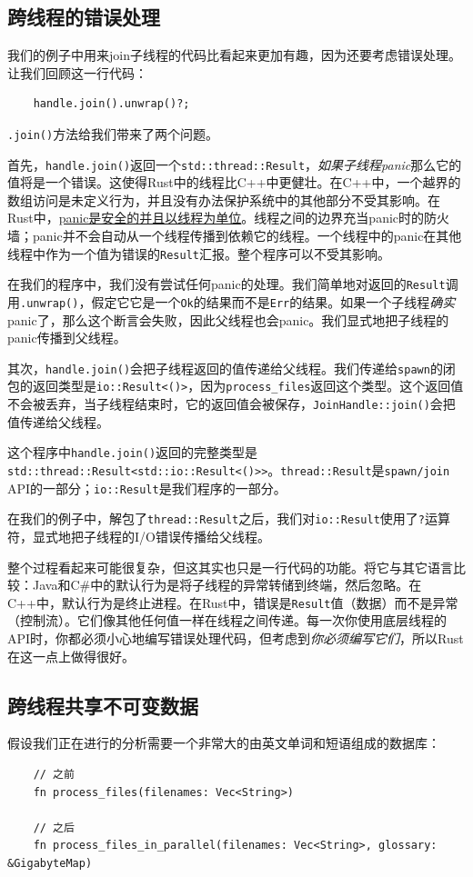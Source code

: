 \subsection{跨线程的错误处理}
我们的例子中用来join子线程的代码比看起来更加有趣，因为还要考虑错误处理。让我们回顾这一行代码：
\begin{verbatim}
    handle.join().unwrap()?;
\end{verbatim}

\texttt{.join()}方法给我们带来了两个问题。

首先，\texttt{handle.join()}返回一个\texttt{std::thread::Result}，\emph{如果子线程panic}那么它的值将是一个错误。这使得Rust中的线程比C++中更健壮。在C++中，一个越界的数组访问是未定义行为，并且没有办法保护系统中的其他部分不受其影响。在Rust中，\hyperref[unwind]{panic是安全的并且以线程为单位}。线程之间的边界充当panic时的防火墙；panic并不会自动从一个线程传播到依赖它的线程。一个线程中的panic在其他线程中作为一个值为错误的\texttt{Result}汇报。整个程序可以不受其影响。

在我们的程序中，我们没有尝试任何panic的处理。我们简单地对返回的\texttt{Result}调用\texttt{.unwrap()}，假定它它是一个\texttt{Ok}的结果而不是\texttt{Err}的结果。如果一个子线程\emph{确实}panic了，那么这个断言会失败，因此父线程也会panic。我们显式地把子线程的panic传播到父线程。

其次，\texttt{handle.join()}会把子线程返回的值传递给父线程。我们传递给\texttt{spawn}的闭包的返回类型是\texttt{io::Result<()>}，因为\texttt{process\_files}返回这个类型。这个返回值不会被丢弃，当子线程结束时，它的返回值会被保存，\texttt{JoinHandle::join()}会把值传递给父线程。

这个程序中\texttt{handle.join()}返回的完整类型是\texttt{std::thread::Result<std::io::Result<()>>}。\texttt{thread::Result}是\texttt{spawn/join} API的一部分；\texttt{io::Result}是我们程序的一部分。

在我们的例子中，解包了\texttt{thread::Result}之后，我们对\texttt{io::Result}使用了\texttt{?}运算符，显式地把子线程的I/O错误传播给父线程。

整个过程看起来可能很复杂，但这其实也只是一行代码的功能。将它与其它语言比较：Java和C\#中的默认行为是将子线程的异常转储到终端，然后忽略。在C++中，默认行为是终止进程。在Rust中，错误是\texttt{Result}值（数据）而不是异常（控制流）。它们像其他任何值一样在线程之间传递。每一次你使用底层线程的API时，你都必须小心地编写错误处理代码，但考虑到\emph{你必须编写它们}，所以Rust在这一点上做得很好。

\subsection{跨线程共享不可变数据}
假设我们正在进行的分析需要一个非常大的由英文单词和短语组成的数据库：
\begin{verbatim}
    // 之前
    fn process_files(filenames: Vec<String>)

    // 之后
    fn process_files_in_parallel(filenames: Vec<String>, glossary: &GigabyteMap)
\end{verbatim}

